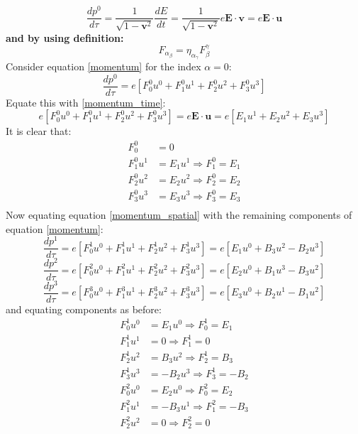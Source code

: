 \documentclass[9pt]{report}
\begin{document}
\begin{enumerate}
\begin{equation}
    \end{equation}
    \begin{equation}
      \frac{dp^0}{d\tau} = \frac{1}{\sqrt{1-\textbf{v}^2}} \frac{dE}{dt} = \frac{1}{\sqrt{1-\textbf{v}^2}}e\textbf{E} \cdot \textbf{v} = e \textbf{E} \cdot \textbf{u} \label{momentum_time}
    \end{equation}
    \textbf{and by using definition:}
    \begin{equation}
      F_\alpha_\beta = \eta_\alpha_\gamma F^\gamma_\beta \label{metric}
    \end{equation}
    Consider equation \ref{momentum} for the index $\alpha=0$:
    \[
      \frac{dp^0}{d\tau} = e [ F^0_0 u^0 + F^0_1 u^1 + F^0_2 u^2 + F^0_3 u^3 ]
    \]
    Equate this with \ref{momentum_time}:
    \[
      e [ F^0_0 u^0 + F^0_1 u^1 + F^0_2 u^2 + F^0_3 u^3 ] = e \textbf{E} \cdot \textbf{u} = e [E_1u^1 + E_2 u^2 + E_3 u^3]
    \]
    It is clear that:
    \[
      \begin{align}
      F_0^0 &= 0 \\
      F^0_1u^1 &= E_1 u^1 \Rightarrow F^0_1 = E_1\\
      F^0_2u^2 &= E_2 u^2 \Rightarrow F^0_2 = E_2\\
      F^0_3u^3 &= E_3 u^3 \Rightarrow F^0_3 = E_3\\
      \end{align}
    \]
    Now equating equation \ref{momentum_spatial} with the remaining components
    of equation \ref{momentum}:
    \[
      \frac{dp^1}{d\tau} = e [ F^1_0 u^0 + F^1_1 u^1 + F^1_2 u^2 + F^1_3 u^3 ] = e [E_1 u^0 + B_3 u^2 - B_2 u^3 ]
    \]
    \[
      \frac{dp^2}{d\tau} = e [ F^2_0 u^0 + F^2_1 u^1 + F^2_2 u^2 + F^2_3 u^3 ] = e [E_2 u^0 + B_1 u^3 - B_3 u^2 ]
    \]
    \[
      \frac{dp^3}{d\tau} = e [ F^3_0 u^0 + F^3_1 u^1 + F^3_2 u^2 + F^3_3 u^3 ] = e [E_3 u^0  + B_2 u^1 - B_1 u^2 ]
    \]
    and equating components as before:
    \[
    \begin{align}
      F^1_0 u^0 &= E_1 u^0 \Rightarrow F_0^1 = E_1 \\
      F^1_1 u^1 &= 0 \Rightarrow F_1^1 = 0 \\
      F^1_2 u^2 &= B_3 u^2 \Rightarrow F_2^1 = B_3 \\
      F^1_3 u^3 &= -B_2 u^3 \Rightarrow F_3^1 = -B_2 \\
      F^2_0 u^0 &= E_2 u^0 \Rightarrow F^2_0 = E_2 \\
      F^2_1 u^1 &= -B_3 u^1 \Rightarrow F^2_1 = - B_3 \\
      F^2_2 u^2 &= 0 \Rightarrow F^2_2 = 0 \\

\end{align}\]
\end{enumerate}
\end{document}
